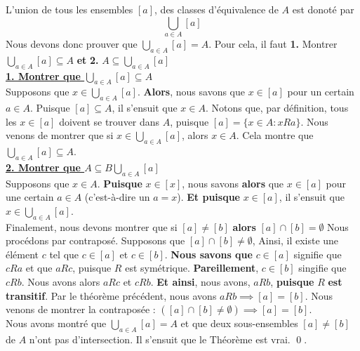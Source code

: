 \documentclass[16pt]{report}
\begin{document}
\begin{multicols*}{2}
            \begin{Preuve}{}{}
                L'union de tous les ensembles $[a]$, des classes d'équivalence de $A$ est donoté par 
                \[ \bigcup_{a \in A} [a] \]
                Nous devons donc prouver que $\bigcup_{a \in A}[a] = A$. Pour cela, il faut \textbf{1.} Montrer 
                $\bigcup_{a \in A}[a] \subseteq A$  \textbf{et} \textbf{2.} $A \subseteq \bigcup_{a \in A}[a] $     
                \vspace{1em}
                \\
                \underline{\textbf{1. Montrer que $\bigcup_{a \in A}[a] \subseteq A$}}
                \vspace{1em}  
                \\
                Supposons que $x \in \bigcup_{a \in A}[a]$. \textbf{Alors}, nous savons que $x \in [a]$ pour un 
                certain $a \in A$. Puisque $[a] \subseteq A$, il s'ensuit que $x \in A$. 
                Notons que, par définition, tous les $x \in [a]$ doivent se trouver dans $A$, puisque 
                $[a] = \{ x \in A : xRa \}$. Nous venons de montrer que si $x \in \bigcup_{a \in A}[a]$, alors 
                $x \in A$. Cela montre que $\bigcup_{a \in A}[a] \subseteq A$.
                \vspace{1em} 
                \\ 
                \underline{\textbf{2. Montrer que $A \subseteq B \bigcup_{a \in A}[a]$}}
                \vspace{1em}  
                \\
                Supposons que $x \in A$. \textbf{Puisque} $x \in [x]$, nous savons \textbf{alors} que 
                $x \in [a]$ pour une certain $a \in A$ (c'est-à-dire un $a = x$). \textbf{Et puisque}
                $x \in [a]$, il s'ensuit que $x \in \bigcup_{a \in A}[a]$.                   
                \vspace{1em}
                \\
                Finalement, nous devons montrer que si $[a] \neq [b]$ \textbf{alors} $[a] \cap [b] = \emptyset$   
                Nous procédons par contraposé. Supposons que $[a] \cap [b] \neq \emptyset$, 
                Ainsi, il existe une élément $c$ tel que $c \in [a]$ et $c \in [b]$. 
                \textbf{Nous savons que} $c \in [a]$ signifie que $cRa$ et que $aRc$, puisque 
                $R$ est symétrique. \textbf{Pareillement}, $c \in [b]$ singifie que $cRb$. Nous avons 
                alors $aRc$ et $cRb$. \textbf{Et ainsi}, nous avons, $aRb$, \textbf{puisque} $R$ 
                \textbf{est transitif}. Par le théorème précédent, nous avons $aRb \implies [a] = [b]$. 
                Nous venons de montrer la contraposée : $([a] \cap [b] \neq \emptyset) \implies [a] = [b]$. 
                \vspace{1em}
                \\
                Nous avons montré que $\bigcup_{a \in A}[a] = A$ et que deux sous-ensembles 
                $[a] \neq [b]$ de $A$ n'ont pas d'intersection. Il s'ensuit que le Théorème est vrai. 
                \qed. 
            \end{Preuve}


\end{multicols*}
\end{document}
